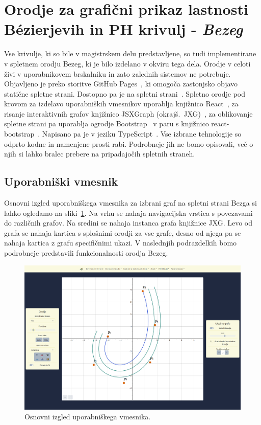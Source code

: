 \documentclass[isrm2, tisk]{fmfdelo}
\begin{document}
    \section{Orodje za grafični prikaz lastnosti Bézierjevih in PH krivulj - \textit{Bezeg}}
    Vse krivulje, ki so bile v magistrskem delu predstavljene, so tudi implementirane v spletnem orodju Bezeg, ki je bilo izdelano v okviru tega dela.
    Orodje v celoti živi v uporabnikovem brskalniku in zato zalednih sistemov ne potrebuje.
    Objavljeno je preko storitve GitHub Pages~\cite{github-pages}, ki omogoča zastonjsko objavo statične spletne strani.
    Dostopno pa je na spletni strani~\cite{spletna-bezeg}.
    Spletno orodje pod krovom za izdelavo uporabniških vmesnikov uporablja knjižnico React~\cite{react},
    za risanje interaktivnih grafov knjižnico JSXGraph (okrajš.\ JXG)~\cite{jxg}, za oblikovanje spletne strani pa uporablja ogrodje Bootstrap~\cite{bootstrap} v paru s knjižnico react-bootstrap~\cite{react-bootstrap}.
    Napisano pa je v jeziku TypeScript~\cite{typescript}.
    Vse izbrane tehnologije so odprto kodne in namenjene prosti rabi.
    Podrobneje jih ne bomo opisovali, več o njih si lahko bralec prebere na pripadajočih spletnih straneh.

    \subsection{Uporabniški vmesnik}\label{subsec:gui}
    Osnovni izgled uporabniškega vmesnika za izbrani graf na spletni strani Bezga si lahko ogledamo na sliki~\ref{fig:bezeg:osnovni-izgled}.
    Na vrhu se nahaja navigacijska vrstica s povezavami do različnih grafov.
    Na sredini se nahaja instanca grafa knjižnice JXG.
    Levo od grafa se nahaja kartica s splošnimi orodji za vse grafe, desno od njega pa se nahaja kartica z grafu specifičnimi ukazi.
    V naslednjih podrazdelkih bomo podrobneje predstavili funkcionalnosti orodja Bezeg.
    \begin{figure}[h]
        \centering
        \includegraphics[width = \textwidth]{images/bezeg/osnovni-izgled}
        \caption{Osnovni izgled uporabniškega vmesnika.}
        \label{fig:bezeg:osnovni-izgled}
    \end{figure}
\end{document}
